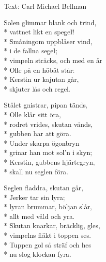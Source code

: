 \begin{SongText}
\begin{SongInfo}
    Text: Carl Michael Bellman
\end{SongInfo}
\begin{SongVerse}
Solen glimmar blank och trind,\\*%
vattnet likt en spegel!\\*%
Småningom uppblåser vind,\\*%
i de fallna segel;\\*%
vimpeln sträcks, och med en år\\*%
Olle på en höbåt står:\\*%
Kerstin ur kajutan går,\\*%
skjuter lås och regel.
\end{SongVerse}
\begin{SongVerse}
Stålet gnistrar, pipan tänds,\\*%
Olle klår sitt öra,\\*%
rodret vrides, skutan vänds,\\*%
gubben har att göra.\\*%
Under skarpa ögonbryn\\*%
grinar han mot sol’n i skyn;\\*%
Kerstin, gubbens hjärtegryn,\\*%
skall nu seglen föra.
\end{SongVerse}
\begin{SongVerse}
Seglen fladdra, skutan går,\\*%
Jerker tar sin lyra;\\*%
lyran brummar, böljan slår,\\*%
allt med våld och yra.\\*%
Skutan knarkar, bräcklig, gles,\\*%
vimpelns fläkt i toppen ses.\\*%
Tuppen gol så sträf och hes\\*%
nu slog klockan fyra. 
\end{SongVerse}
\end{SongText}
